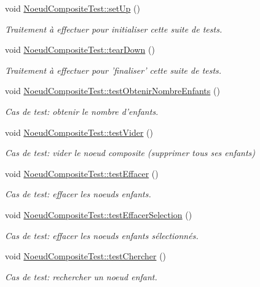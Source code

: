 \begin{DoxyCompactItemize}
void \hyperlink{group__inf2990_gac580ba74910c8d4e8476ce2f4e1930a2}{Noeud\-Composite\-Test\-::set\-Up} ()
\begin{DoxyCompactList}\small\item\em Traitement à effectuer pour initialiser cette suite de tests. \end{DoxyCompactList}\item 
void \hyperlink{group__inf2990_gaab8590913d1e0ce48d52ca2875c12c92}{Noeud\-Composite\-Test\-::tear\-Down} ()
\begin{DoxyCompactList}\small\item\em Traitement à effectuer pour 'finaliser' cette suite de tests. \end{DoxyCompactList}\item 
void \hyperlink{group__inf2990_gae6e5ecfa0bfef3aa50bbfe4b082821e9}{Noeud\-Composite\-Test\-::test\-Obtenir\-Nombre\-Enfants} ()
\begin{DoxyCompactList}\small\item\em Cas de test\-: obtenir le nombre d'enfants. \end{DoxyCompactList}\item 
void \hyperlink{group__inf2990_ga5e667d5f1bc2bf30fe013e5a630d95d5}{Noeud\-Composite\-Test\-::test\-Vider} ()
\begin{DoxyCompactList}\small\item\em Cas de test\-: vider le noeud composite (supprimer tous ses enfants) \end{DoxyCompactList}\item 
void \hyperlink{group__inf2990_ga2f7f5a6ba30a148469a30a8c32a8690c}{Noeud\-Composite\-Test\-::test\-Effacer} ()
\begin{DoxyCompactList}\small\item\em Cas de test\-: effacer les noeuds enfants. \end{DoxyCompactList}\item 
void \hyperlink{group__inf2990_ga9dc8155dc795120e1d6abfbbee81161b}{Noeud\-Composite\-Test\-::test\-Effacer\-Selection} ()
\begin{DoxyCompactList}\small\item\em Cas de test\-: effacer les noeuds enfants sélectionnés. \end{DoxyCompactList}\item 
void \hyperlink{group__inf2990_ga684b84f99cf5a559386a96b8c4468683}{Noeud\-Composite\-Test\-::test\-Chercher} ()
\begin{DoxyCompactList}\small\item\em Cas de test\-: rechercher un noeud enfant. \end{DoxyCompactList}\item 

\end{DoxyCompactItemize}
